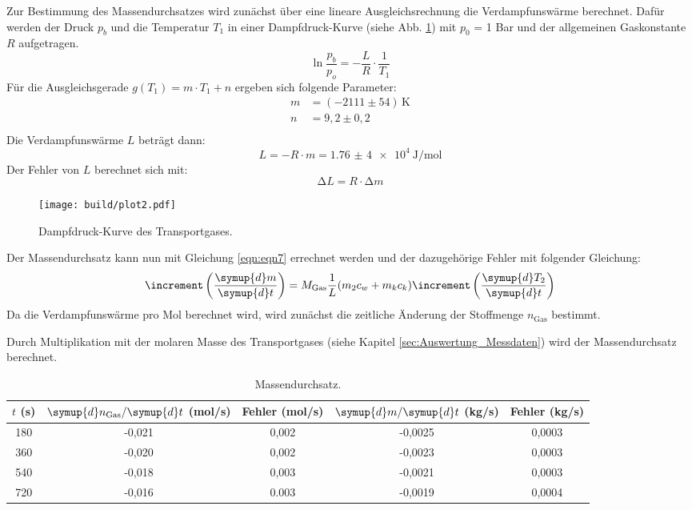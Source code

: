 Zur Bestimmung des Massendurchsatzes wird zunächst über eine lineare Ausgleichsrechnung die Verdampfunswärme berechnet.
Dafür werden der Druck $p_b$ und die Temperatur $T_1$ in einer Dampfdruck-Kurve (siehe Abb. \ref{fig:plot2}) mit $p_0$ = 1 Bar und der allgemeinen Gaskonstante $R$ aufgetragen.
\begin{equation*}
  \ln{\frac{p_b}{p_o}} = - \frac{L}{R} \cdot \frac{1}{T_1}
\end{equation*}
Für die Ausgleichsgerade $g(T_1) = m \cdot T_1 + n$ ergeben sich folgende Parameter:
\begin{align*}
  m &= (-2111 \pm 54) \, \text{K} \\
  n &= 9,2 \pm 0,2 \\
\end{align*}
Die Verdampfunswärme $L$ beträgt dann:
\begin{equation*}
  L = - R \cdot m = \SI{1,76(4)e4}{\joule\per\mol}
\end{equation*}
Der Fehler von $L$ berechnet sich mit:
\begin{equation}
  \increment L = R \cdot \increment m
  \label{eqn:gl12}
\end{equation}
\begin{figure}
  \centering
  \texttt{[image: build/plot2.pdf]}
  \caption{Dampfdruck-Kurve des Transportgases.}
  \label{fig:plot2}
\end{figure}
\FloatBarrier
\noindent
Der Massendurchsatz kann nun mit Gleichung \eqref{eqn:eqn7} errechnet werden und der dazugehörige Fehler mit folgender Gleichung:
\begin{equation}
  \increment \left(\frac{\symup{d}m}{\symup{d}t} \right) = M_\text{Gas} \frac{1}{L} (m_2 c_w + m_k c_k) \increment \left(\frac{\symup{d}T_2}{\symup{d}t} \right)
  \label{eqn:gl13}
\end{equation}
Da die Verdampfunswärme pro Mol berechnet wird, wird zunächst die zeitliche Änderung der Stoffmenge $n_{\text{Gas}}$ bestimmt.

Durch Multiplikation mit der molaren Masse des Transportgases (siehe Kapitel \ref{sec:Auswertung_Messdaten}) wird der Massendurchsatz berechnet.
\begin{table}
  \centering
  \caption{Massendurchsatz.}
  \label{tab:Massendurchsatz}
  \begin{tabular}{c c c c c}
    \toprule
    $t$ (s) & $\symup{d}n_{\text{Gas}}/\symup{d}t$ (mol/s) & Fehler (mol/s) & $\symup{d}m/\symup{d}t$ (kg/s) & Fehler (kg/s)  \\
    \midrule
    180 & -0,021 & 0,002 & -0,0025 & 0,0003 \\
    360 & -0,020 & 0,002 & -0,0023 & 0,0003 \\
    540 & -0,018 & 0,003 & -0,0021 & 0,0003 \\
    720 & -0,016 & 0.003 & -0,0019 & 0,0004 \\
    \bottomrule
  \end{tabular}
\end{table}

